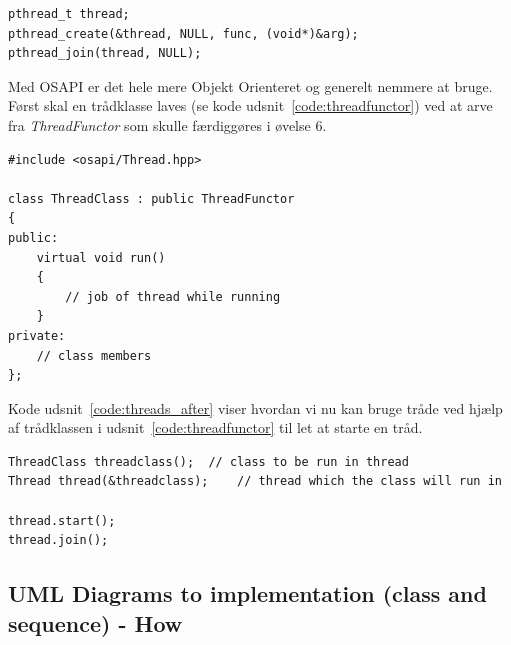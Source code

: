 \begin{lstlisting}[caption=Anvendelse af tråde før OSAPI, label=code:threads_before]
pthread_t thread;
pthread_create(&thread, NULL, func, (void*)&arg);
pthread_join(thread, NULL);
\end{lstlisting}

Med OSAPI er det hele mere Objekt Orienteret og generelt nemmere at bruge. Først skal en trådklasse laves (se kode udsnit~\ref{code:threadfunctor}) ved at arve fra \textit{ThreadFunctor} som skulle færdiggøres i øvelse 6.

\begin{lstlisting}[caption=Trådklasse via nedarvning fra ThreadFunctor, label=code:threadfunctor]
#include <osapi/Thread.hpp>

class ThreadClass : public ThreadFunctor 
{
public:
	virtual void run() 
	{
		// job of thread while running
	}
private:
	// class members
};
\end{lstlisting}

Kode udsnit~\ref{code:threads_after} viser hvordan vi nu kan bruge tråde ved hjælp af trådklassen i udsnit~\ref{code:threadfunctor} til let at starte en tråd.

\begin{lstlisting}[caption=Anvendelse af tråde efter OSAPI,
label=code:threads_after,
morekeywords={ThreadClass, Thread, join, start}]
ThreadClass threadclass();	// class to be run in thread
Thread thread(&threadclass);	// thread which the class will run in

thread.start();
thread.join();
\end{lstlisting}

\subsection{UML Diagrams to implementation (class and sequence) - How}

